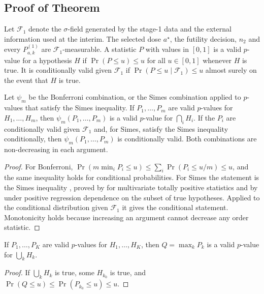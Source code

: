 \begin{appendix}
\section{Proof of Theorem~\protect\thmtone}\label{app:proof}

Let $\mathcal F_1$ denote the $\sigma$-field generated by the stage-1 data and the external information used at the interim. The selected dose $a^\star$, the futility decision, $n_2$ and every $P^{(1)}_{a,k}$ are $\mathcal F_1$-measurable. A statistic $P$ with values in $[0,1]$ is a valid $p$-value for a hypothesis $H$ if $\Pr(P\le u)\le u$ for all $u\in[0,1]$ whenever $H$ is true. It is conditionally valid given $\mathcal F_1$ if $\Pr(P\le u\mid\mathcal F_1)\le u$ almost surely on the event that $H$ is true.

\begin{lemma}\label{lem:comb}
Let $\psi_m$ be the Bonferroni combination, or the Simes combination applied to $p$-values that satisfy the Simes inequality. If $P_1,\dots,P_m$ are valid $p$-values for $H_1,\dots,H_m$, then $\psi_m(P_1,\dots,P_m)$ is a valid $p$-value for $\bigcap_iH_i$. If the $P_i$ are conditionally valid given $\mathcal F_1$ and, for Simes, satisfy the Simes inequality conditionally, then $\psi_m(P_1,\dots,P_m)$ is conditionally valid. Both combinations are non-decreasing in each argument.
\end{lemma}

\begin{proof}
For Bonferroni, $\Pr(m\min_iP_i\le u)\le\sum_i\Pr(P_i\le u/m)\le u$, and the same inequality holds for conditional probabilities. For Simes the statement is the Simes inequality \citep{simes1986}, proved by \citet{sarkar1998} for multivariate totally positive statistics and by \citet{benjamini2001} under positive regression dependence on the subset of true hypotheses. Applied to the conditional distribution given $\mathcal F_1$ it gives the conditional statement. Monotonicity holds because increasing an argument cannot decrease any order statistic.
\end{proof}

\begin{lemma}\label{lem:iu}
If $P_1,\dots,P_K$ are valid $p$-values for $H_1,\dots,H_K$, then $Q=\max_k P_k$ is a valid $p$-value for $\bigcup_k H_k$.
\end{lemma}

\begin{proof}
If $\bigcup_kH_k$ is true, some $H_{k_0}$ is true, and $\Pr(Q\le u)\le\Pr(P_{k_0}\le u)\le u$.
\end{proof}


\end{appendix}
